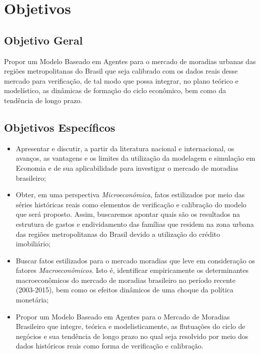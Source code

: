 \section{Objetivos}


\subsection{Objetivo Geral}

Propor um Modelo Baseado em Agentes para o mercado de moradias urbanas das regiões metropolitanas do Brasil que seja calibrado com os dados reais desse mercado para verificação, de tal modo que possa integrar, no plano teórico e modelístico, as dinâmicas de formação do ciclo econômico, bem como da tendência de longo prazo.

\subsection{Objetivos Específicos}

\begin{itemize}
	\item Apresentar e discutir, a partir da literatura nacional e internacional, os avanços, as vantagens e os limites da utilização da modelagem e simulação em Economia e de sua aplicabilidade para investigar o mercado de moradias  brasileiro; 
	
	\item Obter, em uma perspectiva \textit{Microeconômica}, fatos estilizados por meio das séries históricas reais como elementos de verificação e calibração do modelo que será proposto. Assim, buscaremos apontar quais são os resultados na estrutura de gastos e endividamento das famílias que residem na zona urbana das regiões metropolitanas do Brasil devido a utilização do crédito imobiliário;
	
	\item Buscar fatos estilizados para o mercado moradias que leve em consideração os fatores \textit{Macroeconômicos}. Isto é, identificar empiricamente os determinantes macroeconômicos do mercado de moradias brasileiro no período recente (2003-2015), bem como os efeitos dinâmicos de uma choque da política monetária;
	
	\item Propor um Modelo Baseado em Agentes para o Mercado de Moradias Brasileiro que integre, teórica e modelisticamente, as flutuações do ciclo de negócios e sua tendência de longo prazo no qual seja resolvido por meio dos dados históricos reais como forma de verificação e calibração.
\end{itemize}

